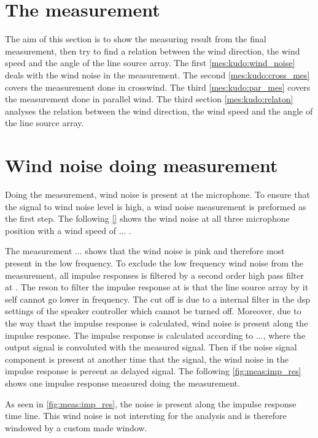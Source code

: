 \section{The measurement}
The aim of this section is to show the measuring result from the final measurement, then try to find a relation between the wind direction, the wind speed and the angle of the line source array. The first \autoref{mes:kudo:wind_noise} deals with the wind noise in the measurement. The second  \autoref{mes:kudo:cross_mes} covers the measurement done in crosswind. The third  \autoref{mes:kudo:par_mes} covers the measurement done in parallel wind. The third section \autoref{mes:kudo:relaton} analyses the relation between the wind direction, the wind speed and the angle of the line source array.


\section{Wind noise doing measurement}\label{mes:kudo:wind_noise}
Doing the measurement, wind noise is present at the microphone. To ensure that the signal to wind noise level is high, a wind noise measurement is preformed as the first step. The following \autoref{} shows the wind noise at all three microphone position with a wind speed of ... . 


The measurement ... shows that the wind noise is pink and therefore most present in the low frequency. To exclude the low frequency wind noise from the measurement, all impulse responses is filtered by a second order high pass filter at . The reson to filter the impulse response at  is that the line source array by it self cannot go lower in frequency. The cut off is due to a internal filter in the \gls{dsp} settings of the speaker controller which cannot be turned off. Moreover, due to the way thast the impulse response is calculated, wind noise is present along the impulse response. The impulse response is calculated according to ..., where the output signal is convoluted with the measured signal. Then if the noise signal component is present at another time that the signal, the wind noise in the impulse response is pereent as delayed signal. The following \autoref{fig:meas:imp_res} shows one impulse response measured doing the measurement.



As seen in \autoref{fig:meas:imp_res}, the noise is present along the impulse response time line. This wind noise is not intersting for the analysis and is therefore windowed by a custom made window.   

